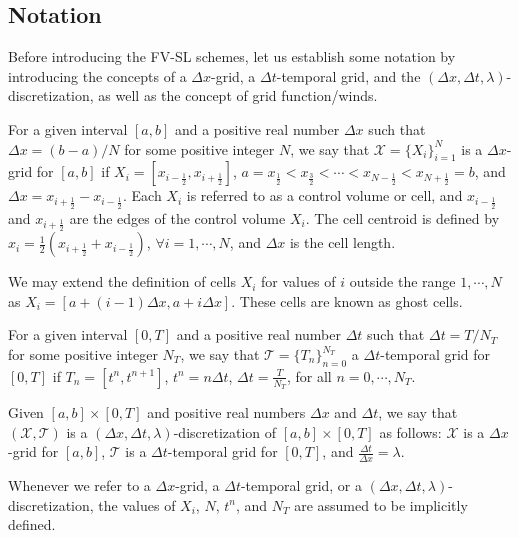 \subsection{Notation}
Before introducing the FV-SL schemes, let us establish some notation by introducing
the concepts of a $\Delta x$-grid, a $\Delta t$-temporal grid, and the
$(\Delta x, \Delta t, \lambda)$-discretization, as well as the concept of grid function/winds.
\begin{definition}
	For a given interval $[a,b]$ and a positive real number $\Delta x$ such that $\Delta x = (b-a)/N$ for some positive integer $N$, 
	we say that $\mathcal{X} = \{X_i \}_{i=1}^{N}$ is a $\Delta x$-grid for $[a,b]$ if
	$X_i = [x_{i-\frac{1}{2}}, x_{i+\frac{1}{2}}]$,
	$a = x_{\frac{1}{2}} < x_{\frac{3}{2}} < \cdots < x_{N-\frac{1}{2}} < x_{N+\frac{1}{2}} = b$,
	and $\Delta x = x_{i+\frac{1}{2}} - x_{i-\frac{1}{2}}$. 
	Each $X_i$ is referred to as a control volume or cell, and $x_{i-\frac{1}{2}}$ and 
	$x_{i+\frac{1}{2}}$ are the edges of the control volume $X_i$.
	The cell centroid is defined by $x_i = \frac{1}{2}(x_{i+\frac{1}{2}} + x_{i-\frac{1}{2}})$, $\forall i = 1, \cdots, N$, 
	and $\Delta x$ is the cell length.
\end{definition}
\begin{remark}
	We may extend the definition of cells $X_i$ for values of $i$ outside the range $1,\cdots,N$ as $X_i = [a+(i-1)\Delta x, a+i\Delta x]$.
	These cells are known as ghost cells.
\end{remark}
\begin{definition}
	For a given interval $[0,T]$ and a positive real number $\Delta t$ such that $\Delta t = T/N_T$
    for some positive integer $N_T$, we say that  $\mathcal{T} = \{T_n\}_{n=0}^{N_T}$ a $\Delta t$-temporal grid for $[0,T]$ if
	$T_n = [t^n, t^{n+1}]$, $t^n = n\Delta t$, $\Delta t = \frac{T}{N_T}$, for all $n = 0, \cdots, N_T$.
\end{definition}
\begin{definition}
	Given $[a,b]\times [0,T]$ and positive real numbers $\Delta x$ and $\Delta t$,
    we say that $(\mathcal{X}, \mathcal{T})$ is a $(\Delta x, \Delta t, \lambda)$-discretization 
    of $[a,b]\times [0,T]$ as follows: $\mathcal{X}$ is a $\Delta x$-grid for $[a,b]$, 
    $\mathcal{T}$ is a $\Delta t$-temporal grid for $[0,T]$, and $\frac{\Delta t}{\Delta x} = \lambda$.
\end{definition}
\begin{remark}
	Whenever we refer to a $\Delta x$-grid, a $\Delta t$-temporal grid, or a $(\Delta x, \Delta t, \lambda)$-discretization, 
	the values of $X_i$, $N$, $t^n$, and $N_T$ are assumed to be implicitly defined.
\end{remark}
